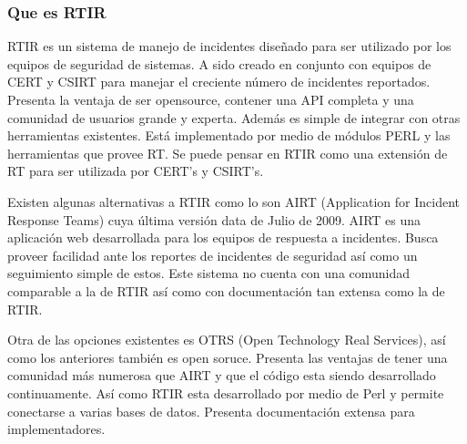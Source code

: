 \subsubsection{Que es RTIR}
RTIR es un sistema de manejo de incidentes diseñado para ser utilizado por los 
equipos de seguridad de sistemas. A sido creado en conjunto con equipos de CERT 
y CSIRT para manejar el creciente número de incidentes reportados.
Presenta la ventaja de ser opensource, contener una API completa y una comunidad 
de usuarios grande y experta. Además es simple de integrar con otras 
herramientas existentes. Está implementado por medio de módulos PERL y las 
herramientas que provee RT. Se puede pensar en RTIR como una extensión de RT 
para ser utilizada por CERT's y CSIRT's.

Existen algunas alternativas a RTIR como lo son AIRT (Application for Incident Response Teams) 
cuya última versión data de Julio de 2009. AIRT es una aplicación web 
desarrollada para los equipos de respuesta a incidentes. Busca proveer facilidad 
ante los reportes de incidentes de seguridad así como un seguimiento simple de 
estos. Este sistema no cuenta con una comunidad comparable a la de RTIR así como 
con documentación tan extensa como la de RTIR.

Otra de las opciones existentes es OTRS (Open Technology Real Services), así 
como los anteriores también es open soruce. Presenta las ventajas de tener una 
comunidad más numerosa que AIRT y que el código esta siendo desarrollado continuamente. 
Así como RTIR esta desarrollado por medio de Perl y permite conectarse a varias 
bases de datos. Presenta documentación extensa para implementadores.